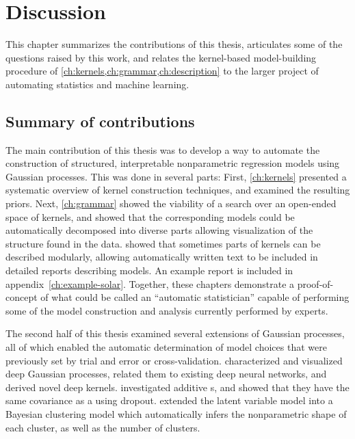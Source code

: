 
\inbpdocument

\chapter{Discussion}
\label{ch:discussion}

This chapter summarizes the contributions of this thesis, articulates some of the questions raised by this work, and relates the kernel-based model-building procedure of \cref{ch:kernels,ch:grammar,ch:description} to the larger project of automating statistics and machine learning.


\section{Summary of contributions}

The main contribution of this thesis was to develop a way to automate the construction of structured, interpretable nonparametric regression models using Gaussian processes.
This was done in several parts:
First, \cref{ch:kernels} presented a systematic overview of kernel construction techniques, and examined the resulting \gp{} priors.
Next, \cref{ch:grammar} showed the viability of a search over an open-ended space of kernels, and showed that the corresponding \gp{} models could be automatically decomposed into diverse parts allowing visualization of the structure found in the data.
 showed that sometimes parts of kernels can be described modularly, allowing automatically written text to be included in detailed reports describing \gp{} models.
An example report is included in appendix~\ref{ch:example-solar}.
Together, these chapters demonstrate a proof-of-concept of what could be called an ``automatic statistician'' capable of performing some of the model construction and analysis currently performed by experts.

The second half of this thesis examined several extensions of Gaussian processes, all of which enabled the automatic determination of model choices that were previously set by trial and error or cross-validation.
 characterized and visualized deep Gaussian processes, related them to existing deep neural networks, and derived novel deep kernels.
 investigated additive \gp{}s, %
and showed that they have the same covariance as a \gp{} using dropout.
 extended the \gp{} latent variable model into a Bayesian clustering model which automatically infers the nonparametric shape of each cluster, as well as the number of clusters.

